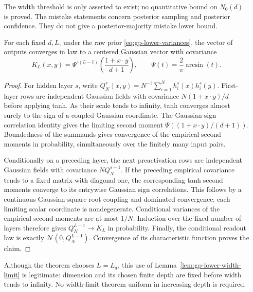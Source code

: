 The width threshold is only asserted to exist; no quantitative bound
on $N_0(d)$ is proved. The mistake statements concern posterior
sampling and posterior confidence. They do not give a
posterior-majority mistake lower bound.

\begin{lemma}
\label{lem:gp-lower-width-limit}
For each fixed $d,L$, under the raw prior
\eqref{eq:gp-lower-variances}, the vector of outputs converges in law to
a centered Gaussian vector with covariance
\begin{equation}\label{eq:gp-lower-kernel}
 K_L(x,y)=\Psi^{\circ(L-1)}
       \left(\frac{1+x\cdot y}{d+1}\right),
 \qquad \Psi(t)=\frac2\pi\arcsin(t).
\end{equation}
\end{lemma}
\begin{proof}
For hidden layer $s$, write
$Q_N^s(x,y)=N^{-1}\sum_{i=1}^N h_i^s(x)h_i^s(y)$.
First-layer rows are independent Gaussian fields with covariance
$N(1+x\cdot y)/d$ before applying tanh. As their scale tends to
infinity, tanh converges almost surely to the sign of a coupled
Gaussian coordinate. The Gaussian sign-correlation identity gives
the limiting second moment
$\Psi((1+x\cdot y)/(d+1))$. Boundedness of the summands gives convergence
of the empirical second moments in probability, simultaneously over
the finitely many input pairs.

Conditionally on a preceding layer, the next preactivation rows are
independent Gaussian fields with covariance $NQ_N^{s-1}$. If the
preceding empirical covariance tends to a fixed matrix with diagonal
one, the corresponding tanh second moments converge to its entrywise
Gaussian sign correlations. This follows by a continuous
Gaussian-square-root coupling and dominated convergence; each
limiting scalar coordinate is nondegenerate. Conditional variances
of the empirical second moments are at most $1/N$.
Induction over the fixed number of layers therefore gives
$Q_N^{L-1}\to K_L$ in probability. Finally, the conditional readout
law is exactly $\mathcal N(0,Q_N^{L-1})$. Convergence of its
characteristic function proves the claim.
\end{proof}

Although the theorem chooses $L=L_d$, this use of
Lemma~\ref{lem:gp-lower-width-limit} is legitimate: dimension and its
chosen finite depth are fixed before width tends to infinity. No
width-limit theorem uniform in increasing depth is required.

